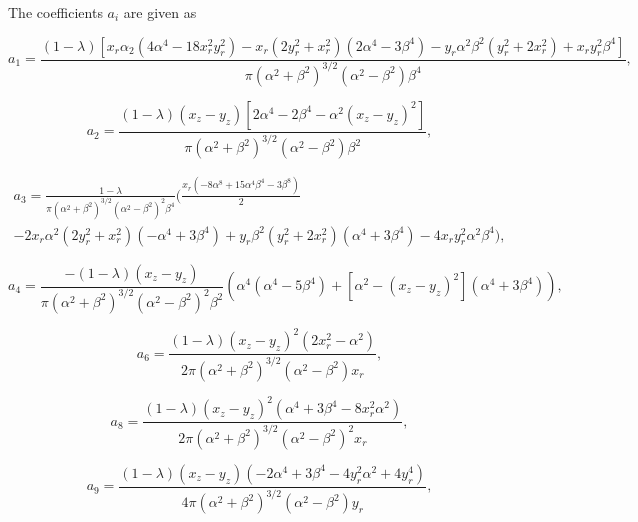 \documentclass[12pt]{article}
\begin{document}
The coefficients $a_{i}$ are given as

\begin{equation}
\label{equ:coeff_a1}
a_{1} = \frac{(1 - \lambda) [x_{r} \alpha_{2} (4 \alpha^{4} - 18 x_{r}^{2} y_{r}^{2}) - x_{r} (2 y_{r}^{2} + x_{r}^{2}) (2 \alpha^{4} - 3 \beta^{4}) - y_{r} \alpha^{2} \beta^{2} (y_{r}^{2} + 2 x_{r}^{2}) + x_{r} y_{r}^{2} \beta^{4}]}{\pi (\alpha^{2} + \beta^{2})^{3/2} (\alpha^{2} - \beta^{2}) \beta^{4}},
\end{equation}

\begin{equation}
\label{equ:equ:coeff_a2}
a_{2} = \frac{(1 - \lambda) (x_{z} - y_{z}) [2 \alpha^{4} - 2 \beta^{4} - \alpha^{2} (x_{z} - y_{z})^{2}]}{\pi (\alpha^{2} + \beta^{2})^{3/2} (\alpha^{2} - \beta^{2}) \beta^{2}},
\end{equation}

\begin{align}
\label{equ:coeff_a3}
a_{3} = \frac{1 - \lambda}{\pi (\alpha^{2} + \beta^{2})^{3/2} (\alpha^{2} - \beta^{2})^{2} \beta^{4}} \bigg( \frac{x_{r} (-8 \alpha^{8} + 15 \alpha^{4} \beta^{4} - 3 \beta^{8})}{2} \nonumber \\
- 2 x_{r} \alpha^{2} (2 y_{r}^{2} + x_{r}^{2}) (-\alpha^{4} + 3 \beta^{4}) + y_{r} \beta^{2} (y_{r}^{2} + 2 x_{r}^{2}) (\alpha^{4} + 3 \beta^{4}) - 4 x_{r} y_{r}^{2} \alpha^{2} \beta^{4} \bigg),
\end{align}

\begin{equation}
\label{equ:coeff_a4}
a_{4} = \frac{-(1 - \lambda) (x_{z} - y_{z})}{\pi (\alpha^{2} + \beta^{2})^{3/2} (\alpha^{2} - \beta^{2})^{2} \beta^{2}} \left(\alpha^{4} (\alpha^{4} - 5 \beta^{4}) + [\alpha^{2}- (x_{z} - y_{z})^{2}] (\alpha^{4} + 3 \beta^{4}) \right),
\end{equation}

\begin{equation}
\label{equ:coeff_a6}
a_{6} = \frac{(1 - \lambda) (x_{z} - y_{z})^{2} (2 x_{r}^{2} - \alpha^{2})}{2 \pi (\alpha^{2} + \beta^{2})^{3/2} (\alpha^{2} - \beta^{2}) x_{r}},
\end{equation}

\begin{equation}
\label{equ:coeff_a8}
a_{8} = \frac{(1 - \lambda) (x_{z} - y_{z})^{2} (\alpha^{4} + 3 \beta^{4} - 8 x_{r}^{2} \alpha^{2})}{2 \pi (\alpha^{2} + \beta^{2})^{3/2} (\alpha^{2} - \beta^{2})^{2} x_{r}},
\end{equation}

\begin{equation}
\label{equ:coeff_a9}
a_{9} = \frac{(1 - \lambda) (x_{z} - y_{z}) (-2 \alpha^{4} + 3 \beta^{4} - 4 y_{r}^{2} \alpha^{2} + 4 y_{r}^{4})}{4 \pi (\alpha^{2} + \beta^{2})^{3/2} (\alpha^{2} - \beta^{2}) y_{r}},
\end{equation}
\end{document}
